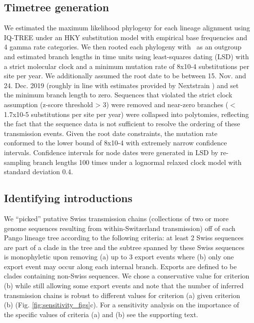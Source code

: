 \documentclass[9pt,twoside,lineno]{pnas-new} %
\begin{document}
\subsection*{Timetree generation}
We estimated the maximum likelihood phylogeny for each lineage alignment using IQ-TREE \cite{Nguyen2014} under an HKY substitution model \cite{Hasegawa1985} with empirical base frequencies and 4 gamma rate categories. We then rooted each phylogeny with \outgroupgisaidepiisls\ as an outgroup and estimated branch lengths in time units using least-squares dating (LSD) \cite{To2016} with a strict molecular clock and a minimum mutation rate of 8x10-4 substitutions per site per year. We additionally assumed the root date to be between 15. Nov. and 24. Dec. 2019 (roughly in line with estimates provided by Nextstrain \cite{Nextstrainteam}) and set the minimum branch length to zero. Sequences that violated the strict clock assumption (z-score threshold > 3) were removed and near-zero branches ($<$1.7x10-5 substitutions per site per year) were collapsed into polytomies, reflecting the fact that the sequence data is not sufficient to resolve the ordering of these transmission events. Given the root date constraints, the mutation rate conformed to the lower bound of 8x10-4 with extremely narrow confidence intervals. Confidence intervals for node dates were generated in LSD by re- sampling branch lengths 100 times under a lognormal relaxed clock model with standard deviation 0.4.

\subsection*{Identifying introductions}
We ``picked'' putative Swiss transmission chains (collections of two or more genome sequences resulting from within-Switzerland transmission) off of each Pango lineage tree according to the following criteria: at least 2 Swiss sequences are part of a clade in the tree and the subtree spanned by these Swiss sequences is monophyletic upon removing (a) up to 3 export events where (b) only one export event may occur along each internal branch. Exports are defined to be clades containing non-Swiss sequences. We chose a conservative value for criterion (b) while still allowing some export events and note that the number of inferred transmission chains is robust to different values for criterion (a) given criterion (b) (Fig. \ref{fig:sensitivity_figs}c). For a sensitivity analysis on the importance of the specific values of criteria (a) and (b) see the supporting text.
\end{document}
